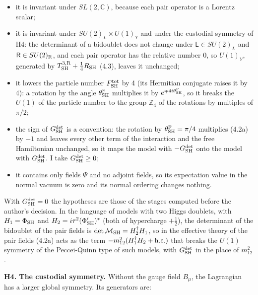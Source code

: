 \documentclass[
  10pt,
]{article}
\providecommand{\tightlist}{%
  \setlength{\itemsep}{0pt}\setlength{\parskip}{0pt}}
\begin{document}
\begin{itemize}
\tightlist
\item
  it is invariant under \(SL(2,\mathbb C)\), because each pair operator
  is a Lorentz scalar;
\item
  it is invariant under \(SU(2)_L\times U(1)_Y\) and under the custodial
  symmetry of H4: the determinant of a bidoublet does not change under
  \(\mathsf L\in SU(2)_L\) and \(\mathsf R\in SU(2)_{\rm R}\), and each
  pair operator has the relative number 0, so \(U(1)_Y\), generated by
  \(T^{3,{\rm R}}_{\rm SH}+\tfrac14R_{\rm SH}\) (4.3), leaves it
  unchanged;
\item
  it lowers the particle number \(F^{\rm tot}_{\rm SH}\) by 4 (its
  Hermitian conjugate raises it by 4): a rotation by the angle
  \(\theta^{\rm F}_{\rm SH}\) multiplies it by
  \(e^{\mp4i\theta^{\rm F}_{\rm SH}}\), so it breaks the \(U(1)\) of the
  particle number to the group \(\mathbb Z_4\) of the rotations by
  multiples of \(\pi/2\);
\item
  the sign of \(G^{\rm det}_{\rm SH}\) is a convention: the rotation by
  \(\theta^{\rm F}_{\rm SH}=\pi/4\) multiplies (4.2a) by \(-1\) and
  leaves every other term of the interaction and the free Hamiltonian
  unchanged, so it maps the model with \(-G^{\rm det}_{\rm SH}\) onto
  the model with \(G^{\rm det}_{\rm SH}\). I take
  \(G^{\rm det}_{\rm SH}\ge0\);
\item
  it contains only fields \(\Psi\) and no adjoint fields, so its
  expectation value in the normal vacuum is zero and its normal ordering
  changes nothing.
\end{itemize}

With \(G^{\rm det}_{\rm SH}=0\) the hypotheses are those of the stages
computed before the author's decision. In the language of models with
two Higgs doublets, with \(H_1=\Phi_{\rm SH}\) and
\(H_2=i\tau^2(\Phi'_{\rm SH})^*\) (both of hypercharge \(+\tfrac12\)),
the determinant of the bidoublet of the pair fields is
\(\det\mathcal M_{\rm SH}=H_2^\dagger H_1\), so in the effective theory
of the pair fields (4.2a) acts as the term
\(-m_{12}^2(H_1^\dagger H_2+{\rm h.c.})\) that breaks the \(U(1)\)
symmetry of the Peccei-Quinn type of such models, with
\(G^{\rm det}_{\rm SH}\) in the place of \(m_{12}^2\).

\textbf{H4. The custodial symmetry.} Without the gauge field \(B_\mu\),
the Lagrangian has a larger global symmetry. Its generators are:
\end{document}
